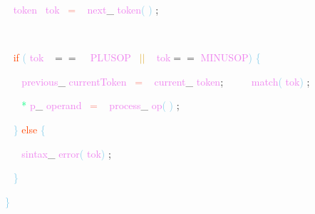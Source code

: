 \documentclass[8, usernames, dvipsnames]{beamer}
\begin{document}
\begin{frame}
\textcolor{White}{\   }
\textcolor{Violet}{token}\textcolor{White}{\ }
\textcolor{Violet}{tok}\textcolor{White}{\ }
\textcolor{Salmon}{=}
\textcolor{White}{\ }
\textcolor{Violet}{next}\textcolor{Sepia}{\_}
\textcolor{Violet}{token}\textcolor{SkyBlue}{(}
\textcolor{SkyBlue}{)}
\textcolor{Sepia}{;}

 \textcolor{White}{\   }

 \textcolor{White}{\   }
\textcolor{OrangeRed}{if}
\textcolor{SkyBlue}{(}
\textcolor{Violet}{tok}\textcolor{White}{\ }
\textcolor{OliveGreen}{$==$}
\textcolor{White}{\ }
\textcolor{Violet}{PLUSOP}\textcolor{White}{\ }
\textcolor{Goldenrod}{ $||$ }
\textcolor{White}{\ }
\textcolor{Violet}{tok}\textcolor{OliveGreen}{$==$}
\textcolor{Violet}{MINUSOP}\textcolor{SkyBlue}{)}
\textcolor{SkyBlue}{\{ }

 \textcolor{White}{\   }
\textcolor{White}{\   }
\textcolor{Violet}{previous}\textcolor{Sepia}{\_}
\textcolor{Violet}{currentToken}\textcolor{White}{\ }
\textcolor{Salmon}{=}
\textcolor{White}{\ }
\textcolor{Violet}{current}\textcolor{Sepia}{\_}
\textcolor{Violet}{token}\textcolor{Sepia}{;}
\textcolor{White}{\ }
\textcolor{White}{\   }
\textcolor{White}{\   }
\textcolor{Violet}{match}\textcolor{SkyBlue}{(}
\textcolor{Violet}{tok}\textcolor{SkyBlue}{)}
\textcolor{Sepia}{;}

 \textcolor{White}{\   }
\textcolor{White}{\   }
\textcolor{SpringGreen}{*}
\textcolor{Violet}{p}\textcolor{Sepia}{\_}
\textcolor{Violet}{operand}\textcolor{White}{\ }
\textcolor{Salmon}{=}
\textcolor{White}{\ }
\textcolor{Violet}{process}\textcolor{Sepia}{\_}
\textcolor{Violet}{op}\textcolor{SkyBlue}{(}
\textcolor{SkyBlue}{)}
\textcolor{Sepia}{;}

 \textcolor{White}{\   }
\textcolor{SkyBlue}{\} }
\textcolor{OrangeRed}{else}
\textcolor{SkyBlue}{\{ }

 \textcolor{White}{\   }
\textcolor{White}{\   }
\textcolor{Violet}{sintax}\textcolor{Sepia}{\_}
\textcolor{Violet}{error}\textcolor{SkyBlue}{(}
\textcolor{Violet}{tok}\textcolor{SkyBlue}{)}
\textcolor{Sepia}{;}

 \textcolor{White}{\   }
\textcolor{SkyBlue}{\} }

 \textcolor{SkyBlue}{\} }

 
 \end{frame}
\end{document}

